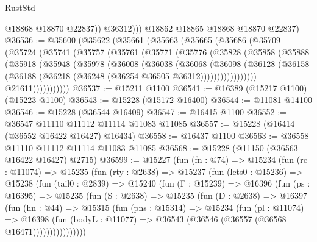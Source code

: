 \begin{lexlean}{RustStd}
\begin{coremodule}
                @18868
                @18870
                @22837))
            @36312)))
      @18862
      @18865
      @18868
      @18870
      @22837)
@36536 := @35600
    (@35622
      (@35661
        (@35663
          (@35665
            (@35686
              (@35709
                (@35724
                  (@35741
                    (@35757
                      (@35761
                        (@35771
                          (@35776
                            (@35828
                              (@35858
                                (@35888
                                  (@35918
                                    (@35948
                                      (@35978
                                        (@36008
                                          (@36038
                                            (@36068
                                              (@36098
                                                (@36128
                                                  (@36158
                                                    (@36188
                                                      (@36218
                                                        (@36248
                                                          (@36254 @36505 @36312)))))))))))))))))
                          @21611)))))))))))
@36537 := @15211 @1100
@36541 := @16389 (@15217 @1100) (@15223 @1100)
@36543 := @15228 (@15172 @16400)
@36544 := @11081 @14100
@36546 := @15228 (@36544 @16409)
@36547 := @16415 @1100
@36552 := @36547 @11110 @11112 @11114 @11083 @11085
@36557 := @15228 (@16414 (@36552 @16422 @16427) @16434)
@36558 := @16437 @1100
@36563 := @36558 @11110 @11112 @11114 @11083 @11085
@36568 := @15228 (@11150 (@36563 @16422 @16427) @2715)
@36599 := @15227
    (fun (fn : @74) =>
    @15234
      (fun (rc : @11074) =>
      @15235
        (fun (rty : @2638) =>
        @15237
          (fun (lets0 : @15236) =>
          @15238
            (fun (tail0 : @2839) =>
            @15240
              (fun (Γ : @15239) =>
              @16396
                (fun (ps : @16395) =>
                @15235
                  (fun (S : @2638) =>
                  @15235
                    (fun (D : @2638) =>
                    @16397
                      (fun (hn : @44) =>
                      @15315
                        (fun (pns : @15314) =>
                        @15234
                          (fun (pl : @11074) =>
                          @16398
                            (fun (bodyL : @11077) =>
                            @36543 (@36546 (@36557 (@36568 @16471))))))))))))))))

\end{coremodule}
\end{lexlean}
